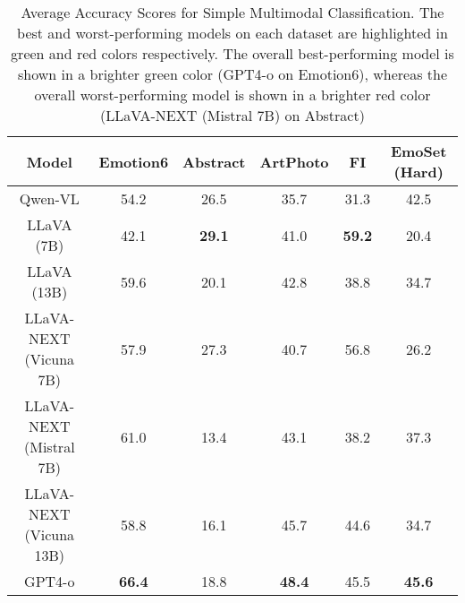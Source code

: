 \begin{table*}
    \centering
    \small
    \begin{tabular}{cccccc}
        \toprule
         Model & Emotion6 & Abstract & ArtPhoto & FI & EmoSet (Hard) \\
         \midrule
         Qwen-VL & 54.2 & 26.5 & \colorbox{red!20}{35.7} & \colorbox{red!20}{31.3} & 42.5 \\
         \midrule
         LLaVA (7B) & \colorbox{red!20}{42.1} & \colorbox{green!20}{\textbf{29.1}} & 41.0 & \colorbox{green!20}{\textbf{59.2}} & \colorbox{red!20}{20.4} \\
         LLaVA (13B) & 59.6 & 20.1 & 42.8 & 38.8 & 34.7 \\
         \midrule
         LLaVA-NEXT (Vicuna 7B) & 57.9 & 27.3 & 40.7 & 56.8 & 26.2 \\
         LLaVA-NEXT (Mistral 7B) & 61.0 & \colorbox{red!40}{13.4} & 43.1 &  38.2 & 37.3 \\
         LLaVA-NEXT (Vicuna 13B) & 58.8 & 16.1 & 45.7 & 44.6 & 34.7 \\
         \midrule
         GPT4-o & \colorbox{green!40}{\textbf{66.4}} & 18.8 & \colorbox{green!20}{\textbf{48.4}} & 45.5 & \colorbox{green!20}{\textbf{45.6}} \\
         \midrule  
    \end{tabular}
    \caption{Average Accuracy Scores for Simple Multimodal Classification. The best and worst-performing models on each dataset
are highlighted in green and red colors respectively. The overall best-performing model is shown in a brighter
green color (GPT4-o on Emotion6), whereas the overall worst-performing model is shown in a brighter red color
(LLaVA-NEXT (Mistral 7B) on Abstract)}
    \label{tab:exp1_accuracies}
\end{table*}

